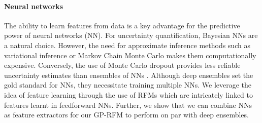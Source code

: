 \paragraph{Neural networks}
The ability to learn features from data is a key advantage for the predictive power of neural networks (NN). For uncertainty quantification, Bayesian NNs \citep{mackay1992bayesian,neal1996bayesian} are a natural choice. However, the need for approximate inference methods such as variational inference \citep{graves2011practical,blundell2015weight} or Markov Chain Monte Carlo \citep{welling2011bayesian} makes them computationally expensive. Conversely, the use of Monte Carlo dropout \citep{gal2016dropout} provides less reliable uncertainty estimates \citep{ovadia2019can,gustafsson2020evaluating} than ensembles of NNs \citep{lakshminarayanan2017simple}. Although deep ensembles set the gold standard for NNs, they necessitate training multiple NNs. We leverage the idea of feature learning through the use of RFMs which are intricately linked to features learnt in feedforward NNs. Further, we show that we can combine NNs as feature extractors for our GP-RFM to perform on par with deep ensembles.
